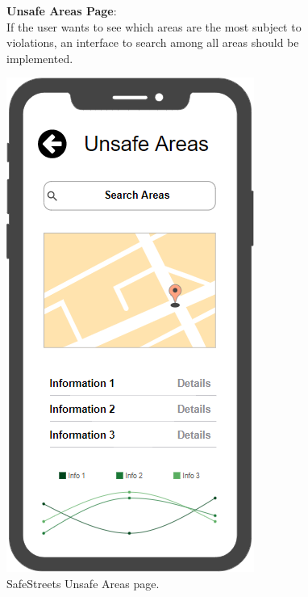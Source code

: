 \begin{figure}
	\begin{flushleft}
		\textbf{Unsafe Areas Page}:\\
		If the user wants to see which areas are the most subject to violations, an interface to search among all areas should be implemented.
	\end{flushleft}
	\centering
	\includegraphics[width=0.6\linewidth]{images/mockups/areas}
	\caption{SafeStreets Unsafe Areas page.}
	\label{fig:areas}
\end{figure}
\clearpage

